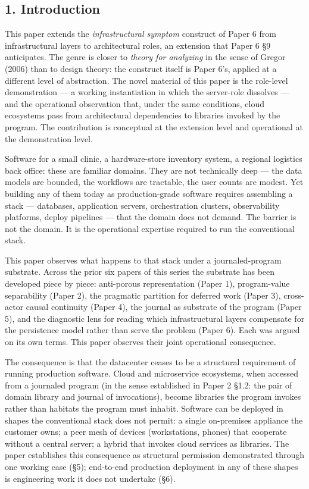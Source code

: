 \documentclass[
]{article}
\begin{document}
\subsection{1. Introduction}\label{introduction}

This paper extends the \emph{infrastructural symptom} construct of Paper
6 from infrastructural layers to architectural roles, an extension that
Paper 6 §9 anticipates. The genre is closer to \emph{theory for
analyzing} in the sense of Gregor (2006) than to design theory: the
construct itself is Paper 6's, applied at a different level of
abstraction. The novel material of this paper is the role-level
demonstration --- a working instantiation in which the server-role
dissolves --- and the operational observation that, under the same
conditions, cloud ecosystems pass from architectural dependencies to
libraries invoked by the program. The contribution is conceptual at the
extension level and operational at the demonstration level.

Software for a small clinic, a hardware-store inventory system, a
regional logistics back office: these are familiar domains. They are not
technically deep --- the data models are bounded, the workflows are
tractable, the user counts are modest. Yet building any of them today as
production-grade software requires assembling a stack --- databases,
application servers, orchestration clusters, observability platforms,
deploy pipelines --- that the domain does not demand. The barrier is not
the domain. It is the operational expertise required to run the
conventional stack.

This paper observes what happens to that stack under a journaled-program
substrate. Across the prior six papers of this series the substrate has
been developed piece by piece: anti-porous representation (Paper 1),
program-value separability (Paper 2), the pragmatic partition for
deferred work (Paper 3), cross-actor causal continuity (Paper 4), the
journal as substrate of the program (Paper 5), and the diagnostic lens
for reading which infrastructural layers compensate for the persistence
model rather than serve the problem (Paper 6). Each was argued on its
own terms. This paper observes their joint operational consequence.

The consequence is that the datacenter ceases to be a structural
requirement of running production software. Cloud and microservice
ecosystems, when accessed from a journaled program (in the sense
established in Paper 2 §1.2: the pair of domain library and journal of
invocations), become libraries the program invokes rather than habitats
the program must inhabit. Software can be deployed in shapes the
conventional stack does not permit: a single on-premises appliance the
customer owns; a peer mesh of devices (workstations, phones) that
cooperate without a central server; a hybrid that invokes cloud services
as libraries. The paper establishes this consequence as structural
permission demonstrated through one working case (§5); end-to-end
production deployment in any of these shapes is engineering work it does
not undertake (§6).
\end{document}
